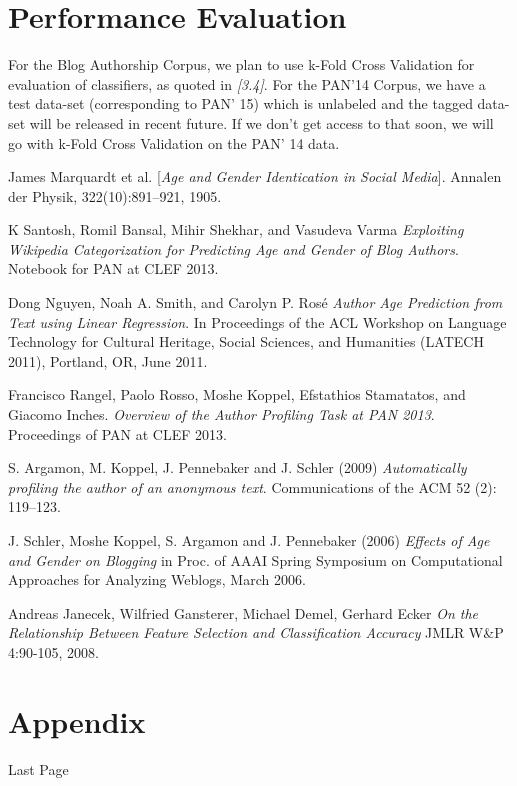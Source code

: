 \documentclass{sig-alternate}
\begin{document}
\section{Performance Evaluation}
For the Blog Authorship Corpus, we plan to use k-Fold Cross Validation for evaluation of classifiers, as quoted in \textit{[3.4]}.
For the PAN'14 Corpus, we have a test data-set (corresponding to PAN' 15) which is unlabeled and the tagged data-set will be released in recent future. If we don't get access to that soon, we will go with k-Fold Cross Validation on the PAN' 14 data. 
\newpage
\begin{thebibliography}{9}
James Marquardt et al.
[\textit{Age and Gender Identication in Social Media}]. 
Annalen der Physik, 322(10):891–921, 1905.

K Santosh, Romil Bansal, Mihir Shekhar, and Vasudeva Varma
\textit{Exploiting Wikipedia Categorization for Predicting Age
and Gender of Blog Authors}. 
Notebook for PAN at CLEF 2013.

Dong Nguyen, Noah A. Smith, and Carolyn P. Rosé
\textit{Author Age Prediction from Text using Linear Regression}. 
In Proceedings of the ACL Workshop on Language Technology for Cultural Heritage, Social Sciences, and Humanities (LATECH 2011), Portland, OR, June 2011.

Francisco Rangel, Paolo Rosso, Moshe Koppel, Efstathios Stamatatos, and Giacomo Inches. \textit{Overview of the Author Profiling Task at PAN 2013}. 
Proceedings of PAN at CLEF 2013.

S. Argamon, M. Koppel, J. Pennebaker and J. Schler (2009) 
\textit{Automatically profiling the author of an anonymous text}. 
Communications of the ACM 52 (2): 119–123.

J. Schler, Moshe Koppel, S. Argamon and J. Pennebaker (2006)
\textit{Effects of Age and Gender on Blogging} 
in Proc. of AAAI Spring Symposium on Computational Approaches for Analyzing Weblogs, March 2006.

Andreas Janecek, Wilfried Gansterer, Michael Demel, Gerhard Ecker
\textit{On the Relationship Between Feature Selection and Classification Accuracy} 
JMLR W\&P 4:90-105, 2008.

\end{thebibliography}

\section{Appendix}
Last Page
\end{document}
